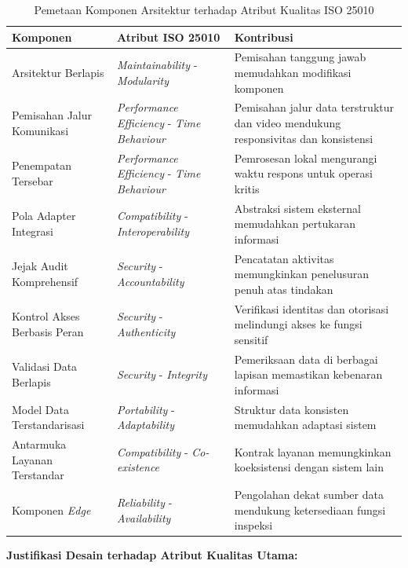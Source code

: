 \begin{table}[ht]
  \centering
  \small
  \caption{Pemetaan Komponen Arsitektur terhadap Atribut Kualitas ISO 25010}
  \label{tbl:iso25010_mapping}
  \begin{tabular}{p{} p{} p{}}
    \toprule
    \textbf{Komponen} & \textbf{Atribut ISO 25010} & \textbf{Kontribusi} \\
    \midrule
    Arsitektur Berlapis & \textit{Maintainability} - \textit{Modularity} & Pemisahan tanggung jawab memudahkan modifikasi komponen \\
    Pemisahan Jalur Komunikasi & \textit{Performance Efficiency} - \textit{Time Behaviour} & Pemisahan jalur data terstruktur dan video mendukung responsivitas dan konsistensi \\
    Penempatan Tersebar & \textit{Performance Efficiency} - \textit{Time Behaviour} & Pemrosesan lokal mengurangi waktu respons untuk operasi kritis \\
    Pola Adapter Integrasi & \textit{Compatibility} - \textit{Interoperability} & Abstraksi sistem eksternal memudahkan pertukaran informasi \\
    Jejak Audit Komprehensif & \textit{Security} - \textit{Accountability} & Pencatatan aktivitas memungkinkan penelusuran penuh atas tindakan \\
    Kontrol Akses Berbasis Peran & \textit{Security} - \textit{Authenticity} & Verifikasi identitas dan otorisasi melindungi akses ke fungsi sensitif \\
    Validasi Data Berlapis & \textit{Security} - \textit{Integrity} & Pemeriksaan data di berbagai lapisan memastikan kebenaran informasi \\
    Model Data Terstandarisasi & \textit{Portability} - \textit{Adaptability} & Struktur data konsisten memudahkan adaptasi sistem \\
    Antarmuka Layanan Terstandar & \textit{Compatibility} - \textit{Co-existence} & Kontrak layanan memungkinkan koeksistensi dengan sistem lain \\
    Komponen \textit{Edge} & \textit{Reliability} - \textit{Availability} & Pengolahan dekat sumber data mendukung ketersediaan fungsi inspeksi \\
    \bottomrule
  \end{tabular}
\end{table}

\FloatBarrier

\textbf{Justifikasi Desain terhadap Atribut Kualitas Utama:}

